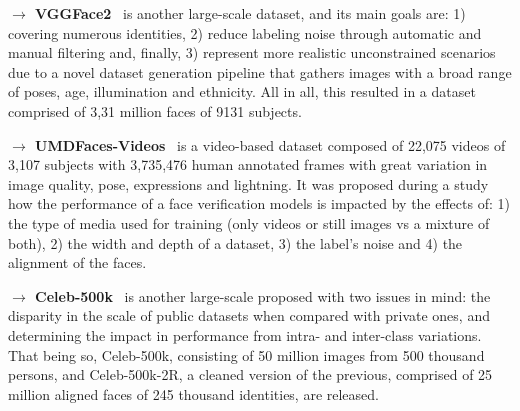 \documentclass[class=report, crop=false, a4paper, 12pt]{standalone}
\begin{document}
\vspace{0.7\baselineskip}
\noindent\textbf{$\rightarrow$ VGGFace2}~\autocite{caoVGGFace2DatasetRecognising2018} is another large-scale dataset, and its main goals are: 1) covering numerous identities, 2) reduce labeling noise through automatic and manual filtering and, finally, 3) represent more realistic unconstrained scenarios due to a novel dataset generation pipeline that gathers images with a broad range of poses, age, illumination and ethnicity. All in all, this resulted in a dataset comprised of 3,31 million faces of 9131 subjects.

\vspace{0.7\baselineskip}
\noindent\textbf{$\rightarrow$ UMDFaces-Videos}~\autocite{bansalDonTsCNNbased2017} is a video-based dataset composed of 22,075 videos of 3,107 subjects with 3,735,476 human annotated frames with great variation in image quality, pose, expressions and lightning. It was proposed during a study how the performance of a face verification models is impacted by the effects of: 1) the type of media used for training (only videos or still images vs a mixture of both), 2) the width and depth of a dataset, 3) the label's noise and 4) the alignment of the faces.




\vspace{0.7\baselineskip}
\noindent\textbf{$\rightarrow$ Celeb-500k}~\autocite{caoCeleb500KLargeTraining2018} is another large-scale proposed with two issues in mind: the disparity in the scale of public datasets when compared with private ones, and determining the impact in performance from intra- and inter-class variations. That being so, Celeb-500k, consisting of 50 million images from 500 thousand persons, and Celeb-500k-2R, a cleaned version of the previous, comprised of 25 million aligned faces of 245 thousand identities, are released.
\end{document}
